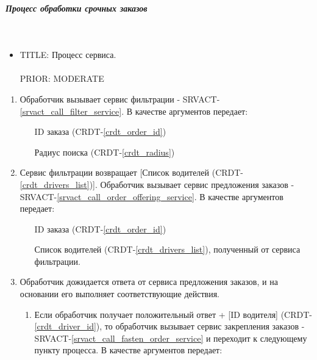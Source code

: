 \subparagraph{Процесс обработки срочных заказов} \mbox{} \\ \label{}

  \begin{itemize}

       \item {
         TITLE: Процесс сервиса.\\
         \\
         PRIOR: MODERATE\\
       }

       \end{itemize}

  \begin{alg} \label{alg_urgent_order_processing} \mbox{}

      \begin{enumerate}

         	\item Обработчик вызывает сервис фильтрации - SRVACT-\ref{srvact_call_filter_service}. В качестве аргументов передает:

         		\begin{enumerate}
         			\item [ID заказа] (CRDT-\ref{crdt_order_id})
         			\item [Радиус поиска] (CRDT-\ref{crdt_radius})
         		\end{enumerate}

          \item Сервис фильтрации возвращает [Список водителей (CRDT-\ref{crdt_drivers_list})]. Обработчик вызывает сервис предложения заказов - SRVACT-\ref{srvact_call_order_offering_service}. В качестве аргументов передает:

         		\begin{enumerate}
         			\item [ID заказа] (CRDT-\ref{crdt_order_id})
         			\item [Список водителей] (CRDT-\ref{crdt_drivers_list}), полученный от сервиса фильтрации.
         		\end{enumerate}
        
          \item Обработчик дожидается ответа от сервиса предложения заказов, и на основании его выполняет соответствующие действия.
          
          	\begin{enumerate}
         			\item Если обработчик получает положительный ответ + [ID водителя] (CRDT-\ref{crdt_driver_id}), то обработчик вызывает сервис закрепления заказов - SRVACT-\ref{srvact_call_fasten_order_service} и переходит к следующему пункту процесса. В качестве аргументов передает: 


\end{enumerate}
\end{enumerate}
\end{alg}
